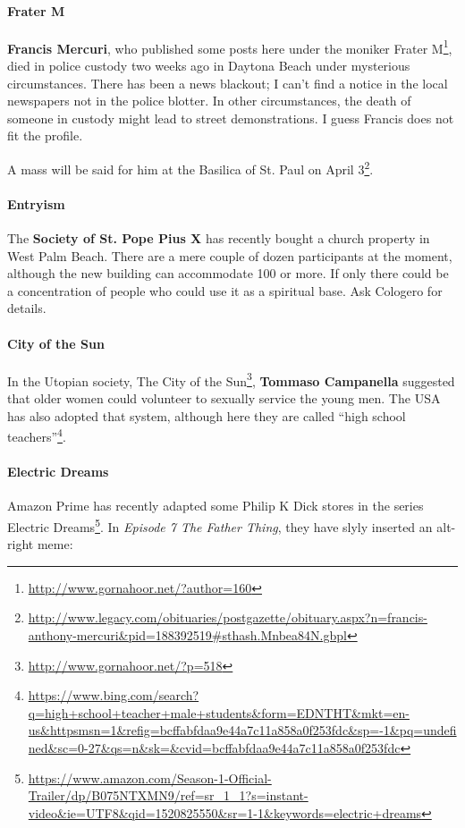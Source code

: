 \paragraph{Frater M}


\textbf{Francis Mercuri}, who published some posts here under the moniker Frater M\footnote{\url{http://www.gornahoor.net/?author=160}}, died in police custody two weeks ago in Daytona Beach under mysterious circumstances. There has been a news blackout; I can't find a notice in the local newspapers not in the police blotter. In other circumstances, the death of someone in custody might lead to street demonstrations. I guess Francis does not fit the profile.

A mass will be said for him at the Basilica of St. Paul on April 3\footnote{\url{http://www.legacy.com/obituaries/postgazette/obituary.aspx?n=francis-anthony-mercuri\&pid=188392519\#sthash.Mnbea84N.gbpl}}.

\paragraph{Entryism}


The \textbf{Society of St. Pope Pius X} has recently bought a church property in West Palm Beach. There are a mere couple of dozen participants at the moment, although the new building can accommodate 100 or more. If only there could be a concentration of people who could use it as a spiritual base. Ask Cologero for details.

\paragraph{City of the Sun}


In the Utopian society, The City of the Sun\footnote{\url{http://www.gornahoor.net/?p=518}}, \textbf{Tommaso Campanella} suggested that older women could volunteer to sexually service the young men. The USA has also adopted that system, although here they are called ``high school teachers''\footnote{\url{https://www.bing.com/search?q=high+school+teacher+male+students\&form=EDNTHT\&mkt=en-us\&httpsmsn=1\&refig=bcffabfdaa9e44a7c11a858a0f253fdc\&sp=-1\&pq=undefined\&sc=0-27\&qs=n\&sk=\&cvid=bcffabfdaa9e44a7c11a858a0f253fdc}}.

\paragraph{Electric Dreams}


Amazon Prime has recently adapted some Philip K Dick stores in the series Electric Dreams\footnote{\url{https://www.amazon.com/Season-1-Official-Trailer/dp/B075NTXMN9/ref=sr_1_1?s=instant-video\&ie=UTF8\&qid=1520825550\&sr=1-1\&keywords=electric+dreams}}. In \emph{Episode 7 The Father Thing}, they have slyly inserted an alt-right meme:

